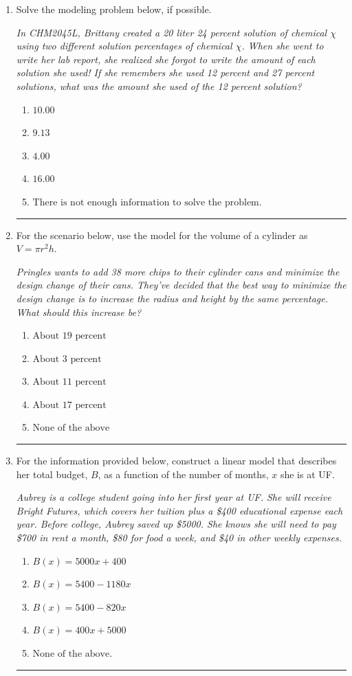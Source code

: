 \documentclass[14pt]{extbook}
\newcommand{\litem}[1]{\item#1\hspace*{-1cm}\rule{\textwidth}{0.4pt}}
\begin{document}
\begin{enumerate}
{\begin{enumerate}[label=\Alph*.]
\end{enumerate} }
\litem{
Solve the modeling problem below, if possible.
\begin{center}
    \textit{ In CHM2045L, Brittany created a 20 liter 24 percent solution of chemical $\chi$ using two different solution percentages of chemical $\chi$. When she went to write her lab report, she realized she forgot to write the amount of each solution she used! If she remembers she used 12 percent and 27 percent solutions, what was the amount she used of the 12 percent solution? }
\end{center}
\begin{enumerate}[label=\Alph*.]
\item \( 10.00 \)
\item \( 9.13 \)
\item \( 4.00 \)
\item \( 16.00 \)
\item \( \text{There is not enough information to solve the problem.} \)

\end{enumerate} }
\litem{
For the scenario below, use the model for the volume of a cylinder as $V = \pi r^2 h$.
\begin{center}
    \textit{ Pringles wants to add 38 \text{percent} more chips to their cylinder cans and minimize the design change of their cans. They've decided that the best way to minimize the design change is to increase the radius and height by the same percentage. What should this increase be? }
\end{center}
\begin{enumerate}[label=\Alph*.]
\item \( \text{About } 19 \text{ percent} \)
\item \( \text{About } 3 \text{ percent} \)
\item \( \text{About } 11 \text{ percent} \)
\item \( \text{About } 17 \text{ percent} \)
\item \( \text{None of the above} \)

\end{enumerate} }
\litem{
For the information provided below, construct a linear model that describes her total budget, $B$, as a function of the number of months, $x$ she is at UF.
\begin{center}
    \textit{ Aubrey is a college student going into her first year at UF. She will receive Bright Futures, which covers her tuition plus a \$400 educational expense each year. Before college, Aubrey saved up \$5000. She knows she will need to pay \$700 in rent a month, \$80 for food a week, and \$40 in other weekly expenses. }
\end{center}
\begin{enumerate}[label=\Alph*.]
\item \( B(x) = 5000 x + 400 \)
\item \( B(x) = 5400 - 1180 x \)
\item \( B(x) = 5400 - 820 x \)
\item \( B(x) = 400 x + 5000 \)
\item \( \text{None of the above.} \)


\end{enumerate}}
\end{enumerate}
\end{document}

